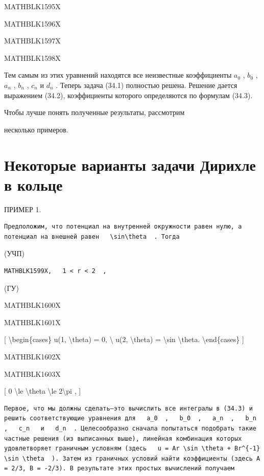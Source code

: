 \documentclass[
]{article}
\begin{document}
{{{MATHBLK1595X

MATHBLK1596X

MATHBLK1597X

MATHBLK1598X

Тем самым из этих уравнений находятся все неизвестные коэффициенты
\(a_0\) , \(b_0\) , \(a_n\) , \(b_n\) , \(c_n\) и \(d_n\) . Теперь
задача (34.1) полностью решена. Решение дается выражением (34.2),
коэффициенты которого определяются по формулам (34.3).

Чтобы лучше понять полученные результаты, рассмотрим

несколько примеров.

\section{Некоторые варианты задачи Дирихле в
кольце}\label{ux43dux435ux43aux43eux442ux43eux440ux44bux435-ux432ux430ux440ux438ux430ux43dux442ux44b-ux437ux430ux434ux430ux447ux438-ux434ux438ux440ux438ux445ux43bux435-ux432-ux43aux43eux43bux44cux446ux435}

ПРИМЕР 1.

\begin{verbatim}
Предположим, что потенциал на внутренней окружности равен нулю, а потенциал на внешней равен   \sin\theta  . Тогда
\end{verbatim}

(УЧП)

\begin{verbatim}
MATHBLK1599X,   1 < r < 2  ,
\end{verbatim}

(ГУ)

MATHBLK1600X

MATHBLK1601X

{[} \textbackslash begin\{cases\} u(1, \textbackslash theta) = 0,
\textbackslash{} u(2, \textbackslash theta) = \textbackslash sin
\textbackslash theta. \textbackslash end\{cases\} {]}

MATHBLK1602X

MATHBLK1603X

{[} 0 \textbackslash le \textbackslash theta \textbackslash le
2\textbackslash pi , {]}

\begin{verbatim}
Первое, что мы должны сделать—это вычислить все интегралы в (34.3) и решить соответствующие уравнения для   a_0  ,   b_0  ,   a_n  ,   b_n  ,   c_n   и   d_n  . Целесообразно сначала попытаться подобрать такие частные решения (из выписанных выше), линейная комбинация которых удовлетворяет граничным условням (здесь   u = Ar \sin \theta + Br^{-1} \sin \theta  ). Затем из граничных условий найти коэффициенты (здесь A = 2/3, B = -2/3). В результате этих простых вычислений получаем


\end{verbatim}}}}
\end{document}
